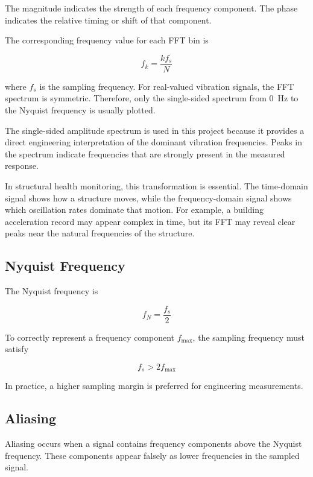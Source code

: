 \documentclass[11pt,a4paper]{article}
\begin{document}
The magnitude indicates the strength of each frequency component. The phase indicates the relative timing or shift of that component.

The corresponding frequency value for each FFT bin is

\begin{equation}
f_k = \frac{k f_s}{N}
\end{equation}

where \(f_s\) is the sampling frequency. For real-valued vibration signals, the FFT spectrum is symmetric. Therefore, only the single-sided spectrum from \SI{0}{Hz} to the Nyquist frequency is usually plotted.

The single-sided amplitude spectrum is used in this project because it provides a direct engineering interpretation of the dominant vibration frequencies. Peaks in the spectrum indicate frequencies that are strongly present in the measured response.

In structural health monitoring, this transformation is essential. The time-domain signal shows how a structure moves, while the frequency-domain signal shows which oscillation rates dominate that motion. For example, a building acceleration record may appear complex in time, but its FFT may reveal clear peaks near the natural frequencies of the structure.

\subsection{Nyquist Frequency}

The Nyquist frequency is

\begin{equation}
f_N = \frac{f_s}{2}
\end{equation}

To correctly represent a frequency component \(f_{\max}\), the sampling frequency must satisfy

\begin{equation}
f_s > 2f_{\max}
\end{equation}

In practice, a higher sampling margin is preferred for engineering measurements.

\subsection{Aliasing}

Aliasing occurs when a signal contains frequency components above the Nyquist frequency. These components appear falsely as lower frequencies in the sampled signal.
\end{document}
